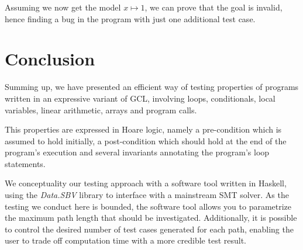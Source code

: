 \documentclass[nonatbib,numbers,10pt]{sigplanconf}
\begin{document}
Assuming we now get the model $x \mapsto 1$, we can prove that the goal is invalid, hence finding a bug in the program with just one additional test case.

\section{Conclusion}
Summing up, we have presented an efficient way of testing properties of programs written in an expressive variant of GCL, involving loops, conditionals, local variables, linear arithmetic, arrays and program calls. 

This properties are expressed in Hoare logic, namely a pre-condition which is assumed to hold initially, a post-condition which should hold at the end of the program's execution and several invariants annotating the program's loop statements.

We conceptuality our testing approach with a software tool written in Haskell, using the \textit{Data.SBV} library to interface with a mainstream SMT solver. As the testing we conduct here is bounded, the software tool allows you to parametrize the maximum path length that should be investigated. Additionally, it is possible to control the desired number of test cases generated for each path, enabling the user to trade off computation time with a more credible test result.
\end{document}
